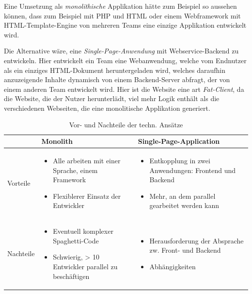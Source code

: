 \documentclass[a4paper, 11pt]{article}
\begin{document}
Eine Umsetzung als \emph{monolithische} Applikation hätte zum Beispiel so
aussehen können, dass zum Beispiel mit PHP und HTML oder einem Webframework mit
HTML-Template-Engine von mehreren Teams eine einzige Applikation entwickelt
wird.

Die Alternative wäre, eine \emph{Single-Page-Anwendung} mit Webservice-Backend
zu entwickeln. Hier entwickelt ein Team eine Webanwendung, welche vom Endnutzer
als ein einziges HTML-Dokument heruntergeladen wird, welches daraufhin
anzuzeigende Inhalte dynamisch von einem Backend-Server abfragt, der von einem
anderen Team entwickelt wird. Hier ist die Website eine art \emph{Fat-Client},
da die Website, die der Nutzer herunterlädt, viel mehr Logik enthält als die
verschiedenen Webseiten, die eine monolitische Applikation generiert.

\begin{table}
    \centering
    \begin{tabularx}{\textwidth}[htbp]{|l|X|X|}
        \hline
        \rowcolor[HTML]{E0E0E0}
        & \textbf{Monolith} & \textbf{Single-Page-Application}
        \\ \hline
        Vorteile & 
        \begin{itemize}[noitemsep,topsep=0pt,parsep=0pt,partopsep=0pt]
            \item Alle arbeiten mit einer Sprache, einem Framework
            \item Flexiblerer Einsatz der Entwickler
        \end{itemize}
        &
        \begin{itemize}[noitemsep,topsep=0pt,parsep=0pt,partopsep=0pt]
            \item Entkopplung in zwei Anwendungen: Frontend und Backend 
            \item Mehr, an dem parallel gearbeitet werden kann
        \end{itemize}
        \\ \hline
        Nachteile   &
        \begin{itemize}[noitemsep,topsep=0pt,parsep=0pt,partopsep=0pt]
            \item Eventuell komplexer Spaghetti-Code
            \item Schwierig, > 10 Entwickler parallel zu beschäftigen
        \end{itemize}
        &
        \begin{itemize}[noitemsep,topsep=0pt,parsep=0pt,partopsep=0pt]
            \item Herausforderung der Absprache zw. Front- und Backend
            \item Abhängigkeiten
        \end{itemize}
        \\ \hline
    \end{tabularx}
    \caption{Vor- und Nachteile der techn. Ansätze}
    \label{tab:pro_contra}
\end{table}
\end{document}
